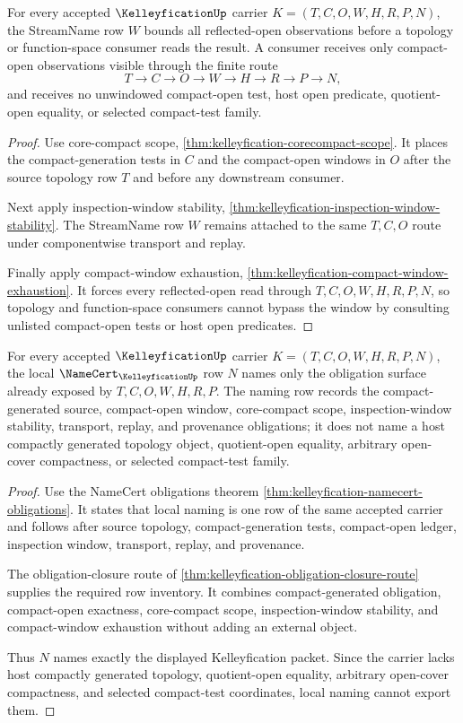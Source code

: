 \begin{theorem}
\label{thm:kelleyfication-streamname-scope}
For every accepted $\KelleyficationUp$ carrier $K=(T,C,O,W,H,R,P,N)$, the StreamName row $W$ bounds all reflected-open observations before a topology or function-space consumer reads the result. A consumer receives only compact-open observations visible through the finite route
$$
T \to C \to O \to W \to H \to R \to P \to N,
$$
and receives no unwindowed compact-open test, host open predicate, quotient-open equality, or selected compact-test family.
\end{theorem}
\begin{proof}
Use core-compact scope, \autoref{thm:kelleyfication-corecompact-scope}. It places the compact-generation tests in $C$ and the compact-open windows in $O$ after the source topology row $T$ and before any downstream consumer.

Next apply inspection-window stability, \autoref{thm:kelleyfication-inspection-window-stability}. The StreamName row $W$ remains attached to the same $T,C,O$ route under componentwise transport and replay.

Finally apply compact-window exhaustion, \autoref{thm:kelleyfication-compact-window-exhaustion}. It forces every reflected-open read through $T,C,O,W,H,R,P,N$, so topology and function-space consumers cannot bypass the window by consulting unlisted compact-open tests or host open predicates.
\end{proof}

\begin{theorem}
\label{thm:kelleyfication-local-naming-obligation}
For every accepted $\KelleyficationUp$ carrier $K=(T,C,O,W,H,R,P,N)$, the local $\NameCert_{\KelleyficationUp}$ row $N$ names only the obligation surface already exposed by $T,C,O,W,H,R,P$. The naming row records the compact-generated source, compact-open window, core-compact scope, inspection-window stability, transport, replay, and provenance obligations; it does not name a host compactly generated topology object, quotient-open equality, arbitrary open-cover compactness, or selected compact-test family.
\end{theorem}
\begin{proof}
Use the NameCert obligations theorem \autoref{thm:kelleyfication-namecert-obligations}. It states that local naming is one row of the same accepted carrier and follows after source topology, compact-generation tests, compact-open ledger, inspection window, transport, replay, and provenance.

The obligation-closure route of \autoref{thm:kelleyfication-obligation-closure-route} supplies the required row inventory. It combines compact-generated obligation, compact-open exactness, core-compact scope, inspection-window stability, and compact-window exhaustion without adding an external object.

Thus $N$ names exactly the displayed Kelleyfication packet. Since the carrier lacks host compactly generated topology, quotient-open equality, arbitrary open-cover compactness, and selected compact-test coordinates, local naming cannot export them.
\end{proof}

